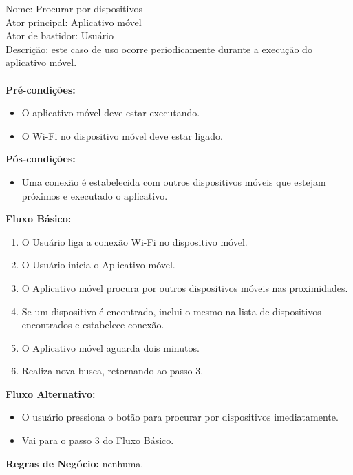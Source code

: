 \noindent Nome: Procurar por dispositivos\\
Ator principal:	Aplicativo móvel\\
Ator de bastidor: Usuário\\
Descrição: este caso de uso ocorre periodicamente durante a execução do aplicativo móvel.\\\\
\textbf{Pré-condições:}
	\begin{itemize}
		\item O aplicativo móvel deve estar executando.
		\item O Wi-Fi no dispositivo móvel deve estar ligado.
	\end{itemize}
\textbf{Pós-condições:}
	\begin{itemize}
		\item Uma conexão é estabelecida com outros dispositivos móveis que estejam próximos e executado o aplicativo.
	\end{itemize}	
\textbf{Fluxo Básico:}
	\begin{enumerate}
		\item O Usuário liga a conexão Wi-Fi no dispositivo móvel.
		\item O Usuário inicia o Aplicativo móvel.
		\item O Aplicativo móvel procura por outros dispositivos móveis nas proximidades.
		\item Se um dispositivo é encontrado, inclui o mesmo na lista de dispositivos encontrados e estabelece conexão.
		\item O Aplicativo móvel aguarda dois minutos.
		\item Realiza nova busca, retornando ao passo 3.
	\end{enumerate}	
\textbf{Fluxo Alternativo:}
	\begin{itemize}
		\item O usuário pressiona o botão para procurar por dispositivos imediatamente.
		\item Vai para o passo 3 do Fluxo Básico.
	\end{itemize}
\textbf{Regras de Negócio:}	nenhuma.

